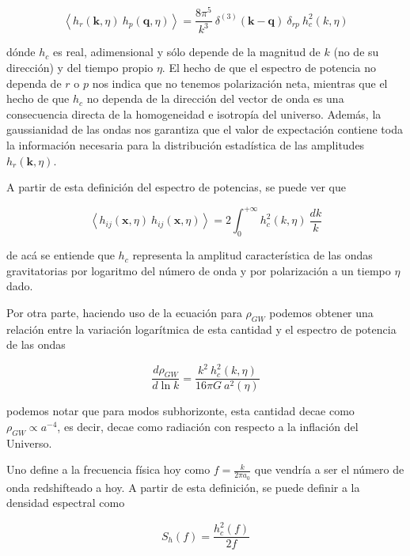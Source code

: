\begin{equation}
    \left\langle h_r (\textbf{k}, \eta) \ h_p (\textbf{q}, \eta) \right\rangle = \frac{8 \pi^5}{k^3} \ \delta^{(3)} (\textbf{k} - \textbf{q}) \ \delta_{rp} \ h^2_c (k, \eta) 
\end{equation}

\noindent
dónde $h_c$ es real, adimensional y sólo depende de la magnitud de $k$ (no de su dirección) y del tiempo propio $\eta$. El hecho de que el espectro de potencia no dependa de $r$ o $p$ nos indica que no tenemos polarización neta, mientras que el hecho de que $h_c$ no dependa de la dirección del vector de onda es una consecuencia directa de la homogeneidad e isotropía del universo. Además, la gaussianidad de las ondas nos garantiza que el valor de expectación contiene toda la información necesaria para la distribución estadística de las amplitudes $h_r (\textbf{k}, \eta)$.

A partir de esta definición del espectro de potencias, se puede ver que 

\begin{equation}
    \left\langle h_{ij} (\textbf{x}, \eta) \ h_{ij} (\textbf{x}, \eta) \right\rangle = 2 \int_0^{+\infty} h^2_c (k, \eta) \ \frac{dk}{k} 
\end{equation}

\noindent
de acá se entiende que $h_c$ representa la amplitud característica de las ondas gravitatorias por logaritmo del número de onda y por polarización a un tiempo $\eta$ dado.

Por otra parte, haciendo uso de la ecuación para $\rho_{GW}$ podemos obtener una relación entre la variación logarítmica de esta cantidad y el espectro de potencia de las ondas

\begin{equation}
    \frac{d \rho_{GW}}{d \ln k} = \frac{k^2 \ h_c^2 (k, \eta)}{16 \pi G \ a^2 (\eta)}
\end{equation}

\noindent
podemos notar que para modos subhorizonte, esta cantidad decae como $\rho_{GW} \propto a^{-4}$, es decir, decae como radiación con respecto a la inflación del Universo.

Uno define a la frecuencia física hoy como $\displaystyle f = \frac{k}{2 \pi a_0}$ que vendría a ser el número de onda redshifteado a hoy. A partir de esta definición, se puede definir a la densidad espectral como

\begin{equation}\label{eqn:S_h}
    S_h(f) = \frac{h_c^2 (f)}{2f}
\end{equation}


